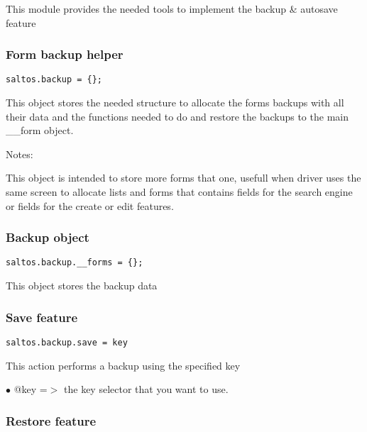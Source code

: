 \documentclass[a4paper]{article}
\begin{document}
This module provides the needed tools to implement the backup \& autosave feature

\hypertarget{toc588}{}
\subsubsection{Form backup helper}

\begin{lstlisting}
saltos.backup = {};
\end{lstlisting}

This object stores the needed structure to allocate the forms backups with all their
data and the functions needed to do and restore the backups to the main \_\_form object.

Notes:

This object is intended to store more forms that one, usefull when driver uses the same
screen to allocate lists and forms that contains fields for the search engine or fields
for the create or edit features.

\hypertarget{toc589}{}
\subsubsection{Backup object}

\begin{lstlisting}
saltos.backup.__forms = {};
\end{lstlisting}

This object stores the backup data

\hypertarget{toc590}{}
\subsubsection{Save feature}

\begin{lstlisting}
saltos.backup.save = key
\end{lstlisting}

This action performs a backup using the specified key

\begin{compactitem}
\item[\color{myblue}$\bullet$] @key =$>$ the key selector that you want to use.
\end{compactitem}

\hypertarget{toc591}{}
\subsubsection{Restore feature}
\end{document}
